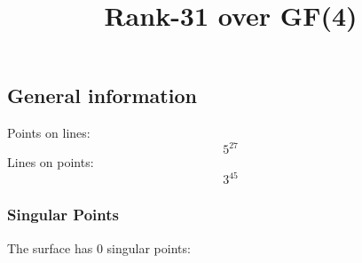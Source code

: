 \documentclass{article}
\newcommand\setTBstruts{\def\T{\rule{0pt}{2.6ex}}%
\def\B{\rule[-1.2ex]{0pt}{0pt}}}
\begin{document}
 
\setTBstruts



{\allowdisplaybreaks%






\title{Rank-31 over GF(4)}
\author{}%
\maketitle%
%
{}



\subsection*{General information}
Points on lines:
$$
5^{27}$$
Lines on points:
$$
3^{45}$$
\subsubsection*{Singular Points}
The surface has 0 singular points:\\
\begin{align*}
\end{align*}
}
\end{document}
